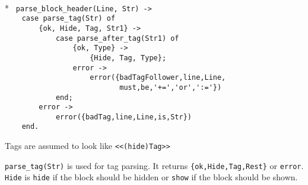 \begin{flushleft}
\label{parsing_8_13}
\\*
\tt
\noindent{}%
\verb&parse_block_header(Line, Str) ->&\\
\noindent{}%
\verb&    case parse_tag(Str) of&\\
\noindent{}%
\verb&        {ok, Hide, Tag, Str1} ->&\\
\noindent{}%
\verb&            case parse_after_tag(Str1) of&\\
\noindent{}%
\verb&                {ok, Type} ->&\\
\noindent{}%
\verb&                    {Hide, Tag, Type};&\\
\noindent{}%
\verb&                error ->&\\
\noindent{}%
\verb&                    error({badTagFollower,line,Line,&\\
\noindent{}%
\verb&                           must,be,'+=','or',':='})&\\
\noindent{}%
\verb&            end;&\\
\noindent{}%
\verb&        error ->&\\
\noindent{}%
\verb&            error({badTag,line,Line,is,Str})&\\
\noindent{}%
\verb&    end.&\\
\end{flushleft}

Tags are assumed to look like \verb+<<(hide)Tag>>+

    \verb+parse_tag(Str)+ is used for tag parsing.  It returns
\verb+{ok,Hide,Tag,Rest}+ or \verb+error+.  \verb+Hide+ is \verb+hide+
if the block should be hidden or \verb+show+ if the block should be
shown.

